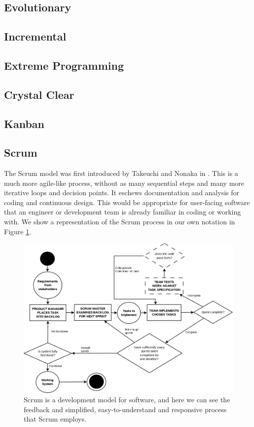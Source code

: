 \subsection{Evolutionary}
\subsection{Incremental}

\subsection{Extreme Programming}

\subsection{Crystal Clear}

\subsection{Kanban}

\subsection{Scrum}
The Scrum model was first introduced by Takeuchi and Nonaka in \cite{takeuchi1986new}.
This is a much more agile-like process, without as many sequential steps and many more iterative
loops and decision points.
It eschews documentation and analysis for coding and continuous design.
This would be appropriate for user-facing software that an engineer or development team is already
familiar in coding or working with.
We show a representation of the Scrum process in our own notation in Figure \ref{ScrumFig}.

\begin{figure}[ht!]
	\includegraphics[scale=0.3]{media/Scrum}
	\caption{Scrum is a development model for software, and here we can see the feedback and
		simplified, easy-to-understand and responsive process that Scrum employs.}
	\label{ScrumFig}
\end{figure}

